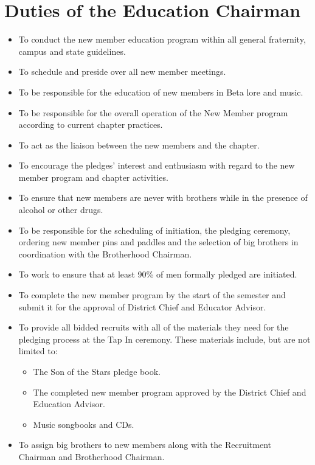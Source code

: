 \section{Duties of the Education Chairman}
\label{sec:duties-of-the-education-chairman}

\begin{itemize}

\item To conduct the new member education program within all general
fraternity, campus and state guidelines. 
\item To schedule and preside over all new member meetings. 
\item To be responsible for the education of new members in Beta lore and
music.  \item To be responsible for the overall operation of the New Member
program according to current chapter practices.
\item To act as the liaison between the new members and the chapter.
\item To encourage the pledges’ interest and enthusiasm with regard to the new
member program and chapter activities.
\item To ensure that new members are never with brothers while in the presence
of alcohol or other drugs.
\item To be responsible for the scheduling of initiation, the pledging
ceremony, ordering new member pins and paddles and the selection of big
brothers in coordination with the Brotherhood Chairman. 
\item To work to ensure that at least 90\% of men formally pledged are
initiated. 
\item To complete the new member program by the start of the semester and
submit it for the approval of District Chief and Educator Advisor. 
\item To provide all bidded recruits with all of the materials they need for
the pledging process at the Tap In ceremony.
These materials include, but are not limited to:

\begin{itemize}

\item The Son of the Stars pledge book.
\item The completed new member program approved by the District Chief and
Education Advisor.
\item Music songbooks and CDs.
\end{itemize}

\item To assign big brothers to new members along with the Recruitment Chairman
and Brotherhood Chairman. 
\end{itemize}

